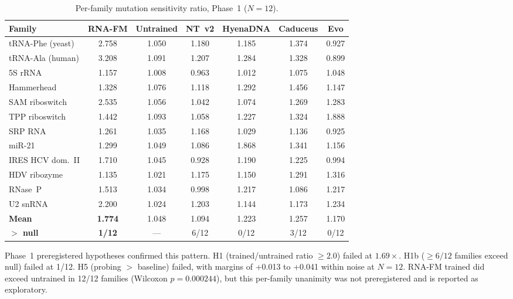 \documentclass[11pt]{article}
\begin{document}
\begin{table}[t]
\centering
\caption{Per-family mutation sensitivity ratio, Phase~1 ($N = 12$).}
\label{tab:per_family_phase1}
\small
\begin{tabular}{@{}lcccccc@{}}
\toprule
\textbf{Family} & \textbf{RNA-FM} & \textbf{Untrained} &
  \textbf{NT~v2} & \textbf{HyenaDNA} & \textbf{Caduceus} &
  \textbf{Evo} \\
\midrule
tRNA-Phe (yeast)  & 2.758 & 1.050 & 1.180 & 1.185 & 1.374 & 0.927 \\
tRNA-Ala (human)  & 3.208 & 1.091 & 1.207 & 1.284 & 1.328 & 0.899 \\
5S rRNA           & 1.157 & 1.008 & 0.963 & 1.012 & 1.075 & 1.048 \\
Hammerhead        & 1.328 & 1.076 & 1.118 & 1.292 & 1.456 & 1.147 \\
SAM riboswitch    & 2.535 & 1.056 & 1.042 & 1.074 & 1.269 & 1.283 \\
TPP riboswitch    & 1.442 & 1.093 & 1.058 & 1.227 & 1.324 & 1.888 \\
SRP RNA           & 1.261 & 1.035 & 1.168 & 1.029 & 1.136 & 0.925 \\
miR-21            & 1.299 & 1.049 & 1.086 & 1.868 & 1.341 & 1.156 \\
IRES HCV dom.~II  & 1.710 & 1.045 & 0.928 & 1.190 & 1.225 & 0.994 \\
HDV ribozyme      & 1.135 & 1.021 & 1.175 & 1.150 & 1.291 & 1.316 \\
RNase~P           & 1.513 & 1.034 & 0.998 & 1.217 & 1.086 & 1.217 \\
U2 snRNA          & 2.200 & 1.024 & 1.203 & 1.144 & 1.173 & 1.234 \\
\midrule
\textbf{Mean}     & \textbf{1.774} & 1.048 & 1.094 & 1.223 & 1.257
                  & 1.170 \\
\textbf{$>$ null} & \textbf{1/12} & --- & 6/12 & 0/12 & 3/12 & 0/12 \\
\bottomrule
\end{tabular}
\end{table}

Phase~1 preregistered hypotheses confirmed this pattern.  H1 (trained/untrained
ratio $\geq 2.0$) failed at $1.69\times$.  H1b ($\geq 6/12$ families
exceed null) failed at 1/12.  H5 (probing $>$ baseline) failed, with
margins of +0.013 to +0.041 within noise at $N = 12$.  RNA-FM trained
did exceed untrained in 12/12 families (Wilcoxon $p = 0.000244$), but
this per-family unanimity was not preregistered and is reported as
exploratory.
\end{document}
